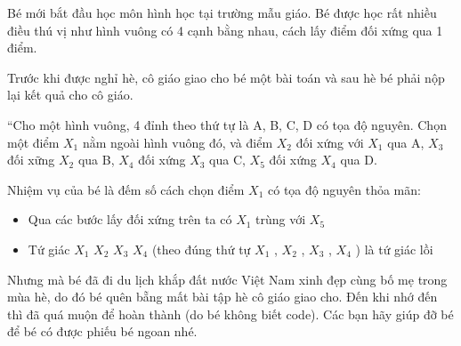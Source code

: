 Bé mới bắt đầu học môn hình học tại trường mẫu giáo. Bé được học rất nhiều điều thú vị như hình vuông có 4 cạnh bằng nhau, cách lấy điểm đối xứng qua 1 điểm.  

   Trước khi được nghỉ hè, cô giáo giao cho bé một bài toán và sau hè bé phải nộp lại kết quả cho cô giáo.  

   “Cho một hình vuông, 4 đỉnh theo thứ tự là A, B, C, D có tọa độ nguyên. Chọn một điểm $X_{1}$   nằm ngoài hình vuông đó, và điểm $X_{2}$   đối xứng với $X_{1}$   qua A, $X_{3}$   đối xững $X_{2}$   qua B, $X_{4}$   đối xứng $X_{3}$   qua C, $X_{5}$   đối xứng $X_{4}$   qua D.  

   Nhiệm vụ của bé là đếm số cách chọn điểm $X_{1}$   có tọa độ nguyên thỏa mãn:  
\begin{itemize}
	\item     Qua các bước lấy đối xứng trên ta có $X_{1}$    trùng với $X_{5}$
	\item     Tứ giác $X_{1}$    $X_{2}$    $X_{3}$    $X_{4}$    (theo đúng thứ tự $X_{1}$    , $X_{2}$    , $X_{3}$    , $X_{4}$    ) là tứ giác lồi   
\end{itemize}

   Nhưng mà bé đã đi du lịch khắp đất nước Việt Nam xinh đẹp cùng bố mẹ trong mùa hè, do đó bé quên bẵng mất bài tập hè cô giáo giao cho. Đến khi nhớ đến thì đã quá muộn để hoàn thành (do bé không biết code). Các bạn hãy giúp đỡ bé để bé có được phiếu bé ngoan nhé.